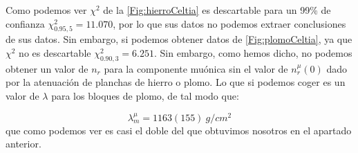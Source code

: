 \documentclass[11pt]{article}
\begin{document}
Como podemos ver $\chi^2$ de la \cref{Fig:hierroCeltia} es descartable para un 99\% de confianza $\chi^2_{0.95,5}=11.070$, por lo que sus datos no podemos extraer conclusiones de sus datos. Sin embargo, si podemos obtener datos de \cref{Fig:plomoCeltia}, ya que $\chi^2$ no es descartable $\chi^2_{0.90,3}=6.251$. Sin embargo, como hemos dicho, no podemos obtener un valor de $n_r$ para la componente muónica sin el valor de $n_r^\mu(0)$ dado por la atenuación de planchas de hierro o plomo. Lo que si podemos coger es un valor de $\lambda$ para los bloques de plomo, de tal modo que: 

\begin{equation}
	\lambda^\mu_m= 1163(155) \ \unit{g/cm^2}
\end{equation}
que como podemos ver es casi el doble del que obtuvimos nosotros en el apartado anterior. 
\end{document}
